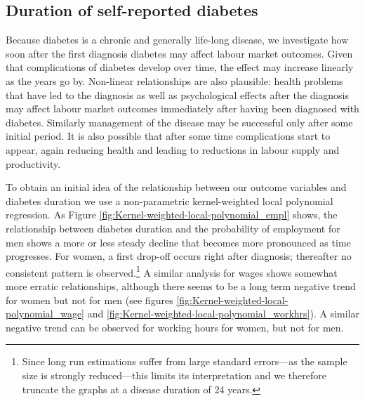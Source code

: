\subsection{\label{sec:duration}Duration of self-reported  diabetes }


Because diabetes is a chronic and generally life-long disease, we investigate how soon after the first diagnosis diabetes may affect labour market outcomes. Given that complications of diabetes develop over time, the effect may increase linearly as the years go by. Non-linear relationships are also plausible: health problems that have led to the diagnosis as well as psychological effects after the diagnosis may affect labour market outcomes immediately after having been diagnosed with diabetes. Similarly management of the disease may be successful only after some initial period. It is also possible that after some time complications start to appear, again reducing health and leading to reductions in labour supply and productivity.


To obtain an initial idea of the relationship between our outcome variables and diabetes duration we use a non-parametric kernel-weighted local polynomial regression. As Figure \ref{fig:Kernel-weighted-local-polynomial_empl} shows, the relationship between diabetes duration and the probability of employment for men shows a more or less steady decline that becomes more pronounced as time progresses. For women,
a first drop-off occurs right after diagnosis; thereafter no consistent pattern is observed.\footnote{Since long run estimations suffer from large standard errors---as the sample size is strongly reduced---this limits its interpretation and we therefore truncate the graphs at a disease duration of 24 years.} A similar analysis for wages shows somewhat more erratic relationships, although there seems to be a long term negative trend for women but not for men (see figures \ref{fig:Kernel-weighted-local-polynomial_wage} and \ref{fig:Kernel-weighted-local-polynomial_workhrs}).  A similar negative trend can be observed for working hours for women, but not for men.

  

